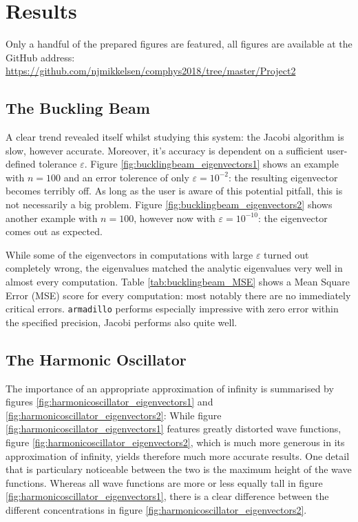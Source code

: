 \documentclass[reprint,english]{revtex4-1}
\begin{document}
\section{Results}
Only a handful of the prepared figures are featured, all figures are available at the GitHub address:\\
{\scriptsize\url{https://github.com/njmikkelsen/comphys2018/tree/master/Project2}}
\subsection{The Buckling Beam}
A clear trend revealed itself whilst studying this system: the Jacobi algorithm is slow, however accurate. Moreover, it's accuracy is dependent on a sufficient user-defined tolerance \(\varepsilon\). Figure \ref{fig:bucklingbeam_eigenvectors1} shows an example with \(n=100\) and an error tolerence of only \(\varepsilon=10^{-2}\): the resulting eigenvector becomes terribly off. As long as the user is aware of this potential pitfall, this is not necessarily a big problem. Figure \ref{fig:bucklingbeam_eigenvectors2} shows another example with \(n=100\), however now with \(\varepsilon=10^{-10}\): the eigenvector comes out as expected.

While some of the eigenvectors in computations with large \(\varepsilon\) turned out completely wrong, the eigenvalues matched the analytic eigenvalues very well in almost every computation. Table \ref{tab:bucklingbeam_MSE} shows a Mean Square Error (MSE) score for every computation: most notably there are no immediately critical errors. \texttt{armadillo} performs especially impressive with zero error within the specified precision, Jacobi performs also quite well.
\subsection{The Harmonic Oscillator}
The importance of an appropriate approximation of infinity is summarised by figures \ref{fig:harmonicoscillator_eigenvectors1} and \ref{fig:harmonicoscillator_eigenvectors2}: While figure \ref{fig:harmonicoscillator_eigenvectors1} features greatly distorted wave functions, figure \ref{fig:harmonicoscillator_eigenvectors2}, which is much more generous in its approximation of infinity, yields therefore much more accurate results. One detail that is particulary noticeable between the two is the maximum height of the wave functions. Whereas all wave functions are more or less equally tall in figure \ref{fig:harmonicoscillator_eigenvectors1}, there is a clear difference between the different concentrations in figure \ref{fig:harmonicoscillator_eigenvectors2}.
\end{document}
